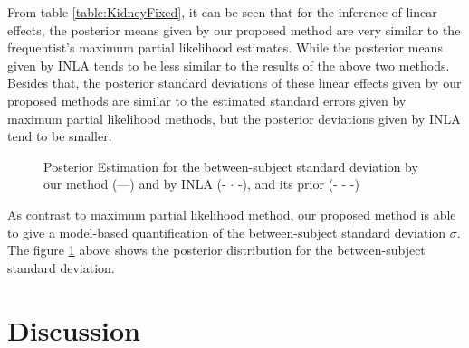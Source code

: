 \documentclass[]{article}
\begin{document}
From table \ref{table:KidneyFixed}, it can be seen that for the inference of linear effects, the posterior means given by our proposed method are very similar to the frequentist's maximum partial likelihood estimates. While the posterior means given by INLA tends to be less similar to the results of the above two methods. Besides that, the posterior standard deviations of these linear effects given by our proposed methods are similar to the estimated standard errors given by maximum partial likelihood methods, but the posterior deviations given by INLA tend to be smaller.

\begin{figure}[ht]
\centering
{}
\caption{Posterior Estimation for the between-subject standard deviation by our method (---) and by INLA (- $\cdot$ -), and its prior (- - -)}
\label{fig:BetweenSubjectSD}
\end{figure}

As contrast to maximum partial likelihood method, our proposed method is able to give a model-based quantification of the between-subject standard deviation $\sigma$. The figure \ref{fig:BetweenSubjectSD} above shows the posterior distribution for the between-subject standard deviation. 



\section{Discussion}\label{sec:discussion}
\end{document}
